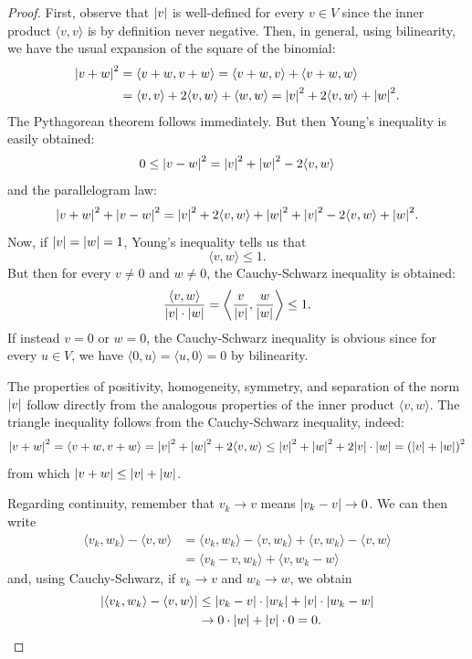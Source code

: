 \begin{proof}
First, observe that ${\left|v\right|}$ is well-defined for every $v\in V$
since the inner product $\langle v,v\rangle$ is by definition never negative.
Then, in general, using bilinearity, we have the usual expansion of the square
of the binomial:
\begin{align*}
  {\left|v+w\right|}^2
  &= \langle v+w, v+w\rangle
  = \langle v+w, v\rangle + \langle v+w, w\rangle \\
  &= \langle v,v\rangle + 2\langle v,w \rangle + \langle w,w\rangle
  = {\left|v\right|}^2 + 2\langle v,w \rangle + {\left|w\right|}^2.
\end{align*}
The Pythagorean theorem follows immediately.
But then Young's inequality is easily obtained:
\[
  0 \le {\left|v-w\right|}^2 = {\left|v\right|}^2 + {\left|w\right|}^2 - 2 \langle v,w\rangle
\]
and the parallelogram law:
\[
  {\left|v+w\right|}^2 + {\left|v-w\right|}^2
  = {\left|v\right|}^2 + 2\langle v,w \rangle + {\left|w\right|}^2
    + {\left|v\right|}^2 - 2\langle v,w\rangle + {\left|w\right|}^2.
\]
Now, if ${\left|v\right|}={\left|w\right|}=1$, Young's inequality tells us that
\[
  \langle v,w \rangle \le 1.
\]
But then for every $v\neq 0$ and $w \neq 0$, the Cauchy-Schwarz inequality is
obtained:
\[
\frac{\langle v,w\rangle}{{\left|v\right|}\cdot {\left|w\right|}}
 = \left\langle \frac{v}{{\left|v\right|}} , \frac{w}{{\left|w\right|}}\right\rangle
 \le 1.
\]
If instead $v=0$ or $w=0$, the Cauchy-Schwarz inequality is obvious since
for every $u\in V$, we have
$\langle 0, u\rangle = \langle u,0\rangle = 0$ by bilinearity.

The properties of positivity, homogeneity, symmetry, and separation of 
the norm ${\left|v\right|}$ follow directly from the analogous properties 
of the inner product $\langle v,w\rangle$.  
The triangle inequality follows from the 
Cauchy-Schwarz inequality,
indeed:
\[
 {\left|v+w\right|}^2 = \langle v+w, v+w\rangle 
 = {\left|v\right|}^2 + {\left|w\right|}^2 + 2 \langle v,w\rangle 
 \le {\left|v\right|}^2 + {\left|w\right|}^2 + 2 {\left|v\right|}\cdot {\left|w\right|}
 = {\left( {\left|v\right|} + {\left|w\right|} \right)}^2
\]
from which ${\left|v+w\right|} \le {\left|v\right|} + {\left|w\right|}$.


Regarding continuity,
remember that $v_k \to v$ means ${\left|v_k-v\right|}\to 0$.
We can then write
\begin{align*}
  \langle v_k,w_k\rangle - \langle v,w\rangle
&= \langle v_k,w_k\rangle - \langle v, w_k\rangle +  \langle v,w_k\rangle -
\langle v,w\rangle \\
&= \langle v_k - v, w_k\rangle + \langle v, w_k -w\rangle
\end{align*}
and, using Cauchy-Schwarz, if $v_k\to v$ and $w_k\to w$, we obtain
\begin{align*}
{\left|\langle v_k,w_k\rangle - \langle v,w\rangle\right|}
&\le {\left|v_k-v\right|}\cdot {\left|w_k\right|} + {\left|v\right|}\cdot {\left|w_k-w\right|}\\
&\to 0\cdot {\left|w\right|} + {\left|v\right|}\cdot 0 = 0.
\end{align*}
\end{proof}

